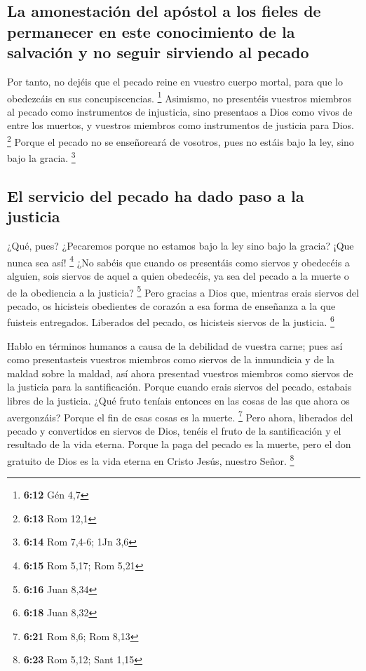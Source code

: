 \hypertarget{la-amonestaciuxf3n-del-apuxf3stol-a-los-fieles-de-permanecer-en-este-conocimiento-de-la-salvaciuxf3n-y-no-seguir-sirviendo-al-pecado}{%
\subsection{La amonestación del apóstol a los fieles de permanecer en
este conocimiento de la salvación y no seguir sirviendo al
pecado}\label{la-amonestaciuxf3n-del-apuxf3stol-a-los-fieles-de-permanecer-en-este-conocimiento-de-la-salvaciuxf3n-y-no-seguir-sirviendo-al-pecado}}

 Por tanto, no dejéis que el pecado reine en vuestro
cuerpo mortal, para que lo obedezcáis en sus concupiscencias.
\footnote{\textbf{6:12} Gén 4,7}  Asimismo, no presentéis
vuestros miembros al pecado como instrumentos de injusticia, sino
presentaos a Dios como vivos de entre los muertos, y vuestros miembros
como instrumentos de justicia para Dios. \footnote{\textbf{6:13} Rom
  12,1}  Porque el pecado no se enseñoreará de vosotros,
pues no estáis bajo la ley, sino bajo la gracia. \footnote{\textbf{6:14}
  Rom 7,4-6; 1Jn 3,6}

\hypertarget{el-servicio-del-pecado-ha-dado-paso-a-la-justicia}{%
\subsection{El servicio del pecado ha dado paso a la
justicia}\label{el-servicio-del-pecado-ha-dado-paso-a-la-justicia}}

 ¿Qué, pues? ¿Pecaremos porque no estamos bajo la ley
sino bajo la gracia? ¡Que nunca sea así! \footnote{\textbf{6:15} Rom
  5,17; Rom 5,21}  ¿No sabéis que cuando os presentáis
como siervos y obedecéis a alguien, sois siervos de aquel a quien
obedecéis, ya sea del pecado a la muerte o de la obediencia a la
justicia? \footnote{\textbf{6:16} Juan 8,34}  Pero
gracias a Dios que, mientras erais siervos del pecado, os hicisteis
obedientes de corazón a esa forma de enseñanza a la que fuisteis
entregados.  Liberados del pecado, os hicisteis siervos
de la justicia. \footnote{\textbf{6:18} Juan 8,32}

 Hablo en términos humanos a causa de la debilidad de
vuestra carne; pues así como presentasteis vuestros miembros como
siervos de la inmundicia y de la maldad sobre la maldad, así ahora
presentad vuestros miembros como siervos de la justicia para la
santificación.  Porque cuando erais siervos del pecado,
estabais libres de la justicia.  ¿Qué fruto teníais
entonces en las cosas de las que ahora os avergonzáis? Porque el fin de
esas cosas es la muerte. \footnote{\textbf{6:21} Rom 8,6; Rom 8,13}
 Pero ahora, liberados del pecado y convertidos en
siervos de Dios, tenéis el fruto de la santificación y el resultado de
la vida eterna.  Porque la paga del pecado es la muerte,
pero el don gratuito de Dios es la vida eterna en Cristo Jesús, nuestro
Señor. \footnote{\textbf{6:23} Rom 5,12; Sant 1,15}

